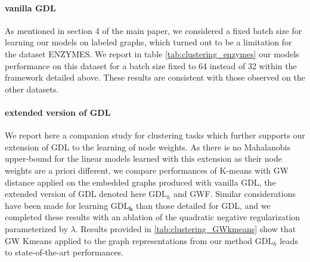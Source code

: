\documentclass{article}
\def\vh{{\bm{h}}}
\begin{document}
	\paragraph{vanilla GDL} As mentioned in section 4 of the main paper, we considered a fixed batch size for learning our models on labeled graphs, which turned out to be a limitation for the dataset ENZYMES. We report in table \ref{tab:clustering_enzymes} our models performance on this dataset for a batch size fixed to 64 instead of 32 within the framework detailed above. These results are consistent with those observed on the other datasets.
	\begin{table*}[h!]
		\vspace*{-5mm}
		\caption{Clustering : dataset ENZYMES}
		\label{tab:clustering_enzymes}
		\begin{center}
		\end{center}
	\end{table*}
	
	\vspace*{-5mm}
	\paragraph{extended version of GDL} We report here a companion study for clustering tasks which further supports our extension of GDL to the learning of node weights. As there is no Mahalanobis upper-bound for the linear models learned with this extension as their node weights are a priori different, we compare performances of K-means with GW distance applied on the embedded graphs produced with vanilla GDL, the extended version of GDL denoted here $\text{GDL}_{h}$ and GWF. Similar considerations have been made for learning $\text{GDL}_{\vh}$ than those detailed for GDL, and we completed these results with an ablation of the quadratic negative regularization parameterized by $\lambda$. Results provided in \ref{tab:clustering_GWkmeans} show that GW Kmeans applied to the graph representations from our method $\text{GDL}_h$ leads to state-of-the-art performances.
	
\end{document}
